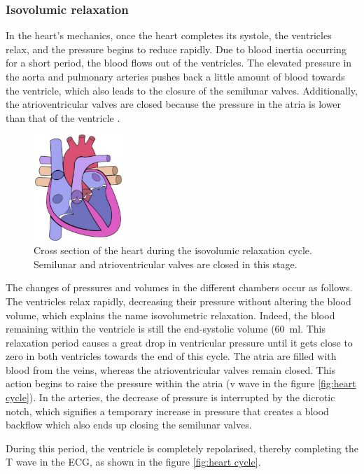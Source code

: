\subsubsection{Isovolumic relaxation}
In the heart's mechanics, once the heart completes its systole, the ventricles relax, and the pressure begins to reduce rapidly. Due to blood inertia occurring for a short period, the blood flows out of the ventricles. The elevated pressure in the aorta and pulmonary arteries pushes back a little amount of blood towards the ventricle, which also leads to the closure of the semilunar valves. Additionally, the atrioventricular valves are closed because the pressure in the atria is lower than that of the ventricle \cite{Hall:2015aa}.

\begin{figure}[!htpb]
	\centering
	\includegraphics[height=4cm,keepaspectratio]{figure_9}
	\caption[Heart during isovolumetric relaxation cycle]{Cross section of the heart during the isovolumic relaxation cycle. Semilunar and atrioventricular valves are closed in this stage.}
	\label{fig:heart isovolumetric relaxation}
\end{figure}

The changes of pressures and volumes in the different chambers occur as follows. The ventricles relax rapidly, decreasing their pressure without altering the blood volume, which explains the name isovolumetric relaxation. Indeed, the blood remaining within the ventricle is still the end-systolic volume (\SI{60}{\milli\litre}. This relaxation period causes a great drop in ventricular pressure until it gets close to zero in both ventricles towards the end of this cycle. The atria are filled with blood from the veins, whereas the atrioventricular valves remain closed. This action begins to raise the pressure within the atria (v wave in the figure \ref{fig:heart cycle}). In the arteries, the decrease of pressure is interrupted by the dicrotic notch, which signifies a temporary increase in pressure that creates a blood backflow which also ends up closing the semilunar valves. 

During this period, the ventricle is completely repolarised, thereby completing the T wave in the ECG, as shown in the figure \ref{fig:heart cycle}.

